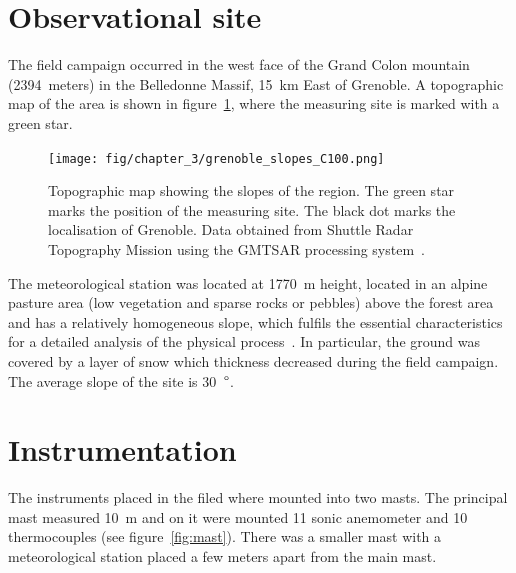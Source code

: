 \section{Observational site}

The field campaign occurred in the west face of the Grand Colon mountain (2394~meters) in the Belledonne Massif, 15~km East of Grenoble. A topographic map of the area is shown in figure~\ref{fig:obs_site}, where the measuring site is marked with a green star. %

\begin{figure}[!ht]
  \begin{center}
  \texttt{[image: fig/chapter\_3/grenoble\_slopes\_C100.png]}
  \caption{Topographic map showing the slopes of the region. The green star marks the position of the measuring site. The black dot marks the localisation of Grenoble. Data obtained from Shuttle Radar Topography Mission using the GMTSAR processing system~\citep{sandwell2011gmtsar}.}
  \label{fig:obs_site}
  \end{center}
\end{figure}

The meteorological station was located at 1770~m height, located in an alpine pasture area (low vegetation and sparse rocks or pebbles) above the forest area and
has a relatively homogeneous slope, which fulfils the essential characteristics for a detailed analysis of the physical process~\citep{blein2016observation}. In particular, the ground was covered by a layer of snow which thickness decreased during the field campaign. The average slope of the site is 30~$\degree$.

\section{Instrumentation} \label{instrumentation}

The instruments placed in the filed where mounted into two masts. The principal mast measured 10~m and on it were mounted 11 sonic anemometer and 10 thermocouples (see figure~\ref{fig:mast}). There was a smaller mast with a meteorological station placed a few meters apart from the main mast. 

